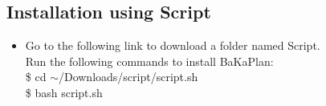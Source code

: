 \subsection{Installation using Script}
\vskip 0.2cm
\begin{itemize}
\item Go to the following link to download a folder named Script.\\
\tab Run the following commands to install BaKaPlan:\\
\tab \$ cd $\sim$/Downloads/script/script.sh\\
\tab \$ bash script.sh
\end{itemize}
